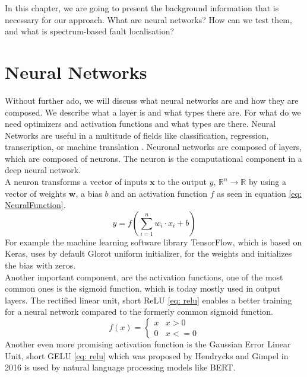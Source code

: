 In this chapter, we are going to present the background information that is necessary for our approach.
What are neural networks?
How can we test them, and what is spectrum-based fault localisation?
\section{Neural Networks}\label{sec:neural-networks}
Without further ado, we will discuss what neural networks are and how they are composed.
We describe what a layer is and what types there are.
For what do we need optimizers and activation functions and what types are there.
Neural Networks are useful in a multitude of fields like classification, regression, transcription, or machine translation \cite{goodfellow_deep_2016}.
Neuronal networks are composed of layers, which are composed of neurons.
The neuron is the computational component in a deep neural network.\\
A neuron transforms a vector of inputs $\mathbf{x}$ to the output $y$, $\mathbb{R}^n \to \mathbb{R}$
by using a vector of weights $\mathbf{w}$, a bias $b$ and an activation function $f$ as seen in equation \ref{eq: NeuralFunction}.
\begin{equation}
    y = f\left( \sum^n_{i=1} w_i\cdot x_i + b\right)
    \label{eq: NeuralFunction}
\end{equation}
For example the machine learning software library TensorFlow, which is based on Keras, uses by default Glorot uniform initializer\cite{noauthor_tfkeraslayersdense_2023,glorot_understanding_2010}, for the weights and initializes the bias with zeros.\\
Another important component, are the activation functions, one of the most common ones is the sigmoid function, which is today mostly used in output layers.
The rectified linear unit, short ReLU \ref{eq: relu}\cite{fukushima_cognitron_1975,glorot_deep_2011} enables a better training for a neural network compared to the formerly common sigmoid function.
\begin{equation}
    f(x) =
    \begin{cases}
        x& x > 0\\
        0& x <= 0
    \end{cases}
    \label{eq: relu}
\end{equation}
Another even more promising activation function is the Gaussian Error Linear Unit, short GELU \ref{eq: relu} which was proposed by Hendrycks and Gimpel in 2016\cite{hendrycks_gaussian_2016} is used by natural language processing models like BERT\cite{devlin_bert_2019}.
